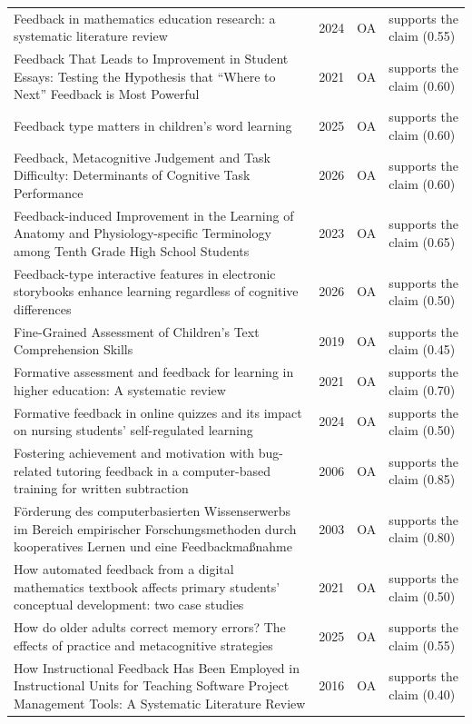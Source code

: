 \begin{longtable}{@{}%
  >{\raggedright\arraybackslash}p{}c%
  >{\raggedright\arraybackslash}p{}%
  >{\raggedright\arraybackslash}p{}@{}}
Feedback in mathematics education research: a systematic literature review & 2024 & OA & supports the claim (0.55) \\
Feedback That Leads to Improvement in Student Essays: Testing the Hypothesis that ``Where to Next'' Feedback is Most Powerful & 2021 & OA & supports the claim (0.60) \\
Feedback type matters in children's word learning & 2025 & OA & supports the claim (0.60) \\
Feedback, Metacognitive Judgement and Task Difficulty: Determinants of Cognitive Task Performance & 2026 & OA & supports the claim (0.60) \\
Feedback-induced Improvement in the Learning of Anatomy and Physiology-specific Terminology among Tenth Grade High School Students & 2023 & OA & supports the claim (0.65) \\
Feedback-type interactive features in electronic storybooks enhance learning regardless of cognitive differences & 2026 & OA & supports the claim (0.50) \\
Fine-Grained Assessment of Children's Text Comprehension Skills & 2019 & OA & supports the claim (0.45) \\
Formative assessment and feedback for learning in higher education: A systematic review & 2021 & OA & supports the claim (0.70) \\
Formative feedback in online quizzes and its impact on nursing students' self-regulated learning & 2024 & OA & supports the claim (0.50) \\
Fostering achievement and motivation with bug-related tutoring feedback in a computer-based training for written subtraction & 2006 & OA & supports the claim (0.85) \\
Förderung des computerbasierten Wissenserwerbs im Bereich empirischer Forschungsmethoden durch kooperatives Lernen und eine Feedbackmaßnahme & 2003 & OA & supports the claim (0.80) \\
How automated feedback from a digital mathematics textbook affects primary students' conceptual development: two case studies & 2021 & OA & supports the claim (0.50) \\
How do older adults correct memory errors? The effects of practice and metacognitive strategies & 2025 & OA & supports the claim (0.55) \\
How Instructional Feedback Has Been Employed in Instructional Units for Teaching Software Project Management Tools: A Systematic Literature Review & 2016 & OA & supports the claim (0.40) \\

\end{longtable}
